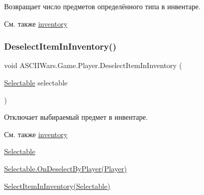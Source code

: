 Возвращает число предметов определённого типа в инвентаре. 

\begin{DoxySeeAlso}{См. также}
\hyperlink{class_a_s_c_i_i_wars_1_1_game_1_1_player_a04acfaa196162f89bfae7aee5ec45480}{inventory} 
\end{DoxySeeAlso}
\hypertarget{class_a_s_c_i_i_wars_1_1_game_1_1_player_a104ae32d59b6e627d55dc78ff4ffa995}{}\label{class_a_s_c_i_i_wars_1_1_game_1_1_player_a104ae32d59b6e627d55dc78ff4ffa995} 
\subsubsection{\texorpdfstring{Deselect\+Item\+In\+Inventory()}{DeselectItemInInventory()}}
{\footnotesize\ttfamily void A\+S\+C\+I\+I\+Wars.\+Game.\+Player.\+Deselect\+Item\+In\+Inventory (\begin{DoxyParamCaption}\item[{\hyperlink{class_a_s_c_i_i_wars_1_1_game_1_1_selectable}{Selectable}}]{selectable }\end{DoxyParamCaption})\hspace{0.3cm}{\ttfamily [inline]}}



Отключает выбираемый предмет в инвентаре. 

\begin{DoxySeeAlso}{См. также}
\hyperlink{class_a_s_c_i_i_wars_1_1_game_1_1_player_a04acfaa196162f89bfae7aee5ec45480}{inventory} 

\hyperlink{class_a_s_c_i_i_wars_1_1_game_1_1_selectable}{Selectable} 

\hyperlink{class_a_s_c_i_i_wars_1_1_game_1_1_selectable_a08a30c8786367bf45355e989b109c44b}{Selectable.\+On\+Deselect\+By\+Player(\+Player)} 

\hyperlink{class_a_s_c_i_i_wars_1_1_game_1_1_player_aec1c1f808fa3da1585a62487b0e92a38}{Select\+Item\+In\+Inventory(\+Selectable)} 
\end{DoxySeeAlso}
\hypertarget{class_a_s_c_i_i_wars_1_1_game_1_1_player_aa58a605f6337c385f4023ea842f6c246}{}\label{class_a_s_c_i_i_wars_1_1_game_1_1_player_aa58a605f6337c385f4023ea842f6c246} 
